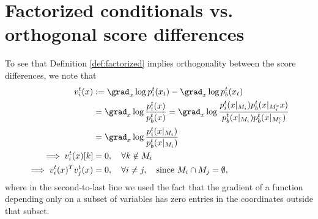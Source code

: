\section{Factorized conditionals vs. orthogonal score differences}
\label{app:score_orthog}
To see that Definition \ref{def:factorized} implies orthogonality between the score differences, we note that
\begin{align*}
    v_i^t(x) &:= \grad_x \log p_i^t(x_t) - \grad_x \log p_b^t(x_t) \\
    &= \grad_x \log \frac{p_i^t(x)}{p_b^t(x)} 
    = \grad_x \log \frac{p_i^t(x|_{M_i}) p_b^t(x|_{M_i^c} x)}{p_b^t(x|_{M_i}) p_b^t(x|_{M_i^c})} \\
    &= \grad_x \log \frac{p_i^t(x|_{M_i})}{p_b^t(x|_{M_i})} \\
    \implies v_i^t(x)[k] &= 0, \quad \forall k \notin M_i \\
    \implies v_i^t(x)^T v_j^t(x) &= 0, \quad \forall i \neq j, \quad \text{since } M_i \cap M_j = \emptyset,
\end{align*}
where in the second-to-last line we used the fact that the gradient of a function depending only on a subset of variables has zero entries in the coordinates outside that subset. 

